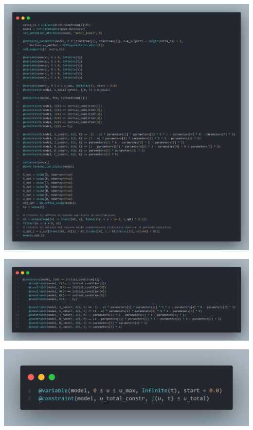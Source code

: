 \begin{minipage}{\linewidth}
	\centering
	\includegraphics[width=\textwidth]{img/controller_ipopt.png}
	\label{fig:controller_ipopt}
\end{minipage}

\begin{minipage}{\linewidth}
	\centering
	\includegraphics[width=\textwidth]{img/controller_rules.png}
	\label{fig:controller_rules}
\end{minipage}

\begin{minipage}{\linewidth}
	\centering
	\includegraphics[width=\textwidth]{img/controller_rules_1.png}
	\label{fig:controller_rules_1}
\end{minipage}

